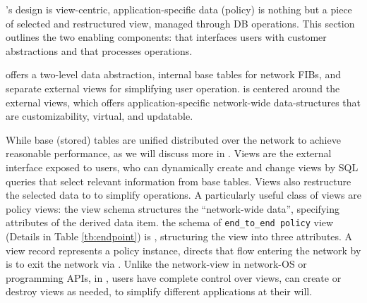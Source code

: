 \label{sec:design}

\Sys's design is view-centric, application-specific data (\eg policy)
is nothing but a piece of selected and restructured view, managed
through DB operations.  This section outlines the two enabling
components: \TI that interfaces users with customer abstractions and
\TR that processes operations.




\TI offers a two-level data abstraction, internal base tables for
network FIBs, and separate external views for simplifying user
operation.  \TI is centered around the external views, which offers
application-specific network-wide data-structures that are
customizability, virtual, and updatable.

 While base (stored) tables are
unified distributed over the network to achieve reasonable
performance, as we will discuss more in \TR. Views are the external
interface exposed to users, who can dynamically create and change
views by SQL queries that select relevant information from base
tables. Views also restructure the selected data to to simplify
operations.  
A particularly useful class of views are policy views: the view schema
structures the ``network-wide data'', specifying attributes of the
derived data item. \Eg the schema of \texttt{end\_to\_end policy} view
(Details in Table \ref{tb:endpoint}) is , structuring the view into three attributes. A view record
represents a policy instance, \eg {} directs that flow
 entering the network by  is to exit the network via
. Unlike the network-view in network-OS or programming APIs, in
\Sys, users have complete control over views, can create or destroy
views as needed, to simplify different applications at their will.

